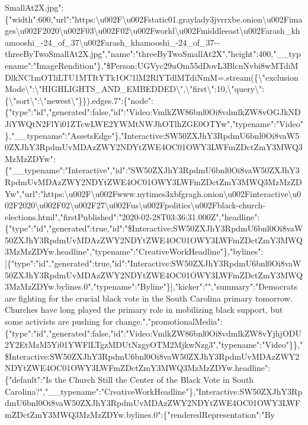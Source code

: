 SmallAt2X.jpg":\{"width":600,"url":"https:\textbackslash{}u002F\textbackslash{}u002Fstatic01.graylady3jvrrxbe.onion\textbackslash{}u002Fimages\textbackslash{}u002F2020\textbackslash{}u002F03\textbackslash{}u002F02\textbackslash{}u002Fworld\textbackslash{}u002Fmiddleeast\textbackslash{}u002Farash\_khamooshi\_-24\_of\_37\textbackslash{}u002Farash\_khamooshi\_-24\_of\_37-\/-threeByTwoSmallAt2X.jpg","name":"threeByTwoSmallAt2X","height":400,"\_\_typename":"ImageRendition"\},"\$Person:UGVyc29uOm55dDovL3BlcnNvbi8wMTdiMDlkNC1mOTliLTU1MTItYTk1OC1lM2RlYTdlMTdiNmM=.stream(\{\textbackslash{}"exclusionMode\textbackslash{}":\textbackslash{}"HIGHLIGHTS\_AND\_EMBEDDED\textbackslash{}",\textbackslash{}"first\textbackslash{}":10,\textbackslash{}"query\textbackslash{}":\{\textbackslash{}"sort\textbackslash{}":\textbackslash{}"newest\textbackslash{}"\}\}).edges.7":\{"node":\{"type":"id","generated":false,"id":"Video:VmlkZW86bnl0Oi8vdmlkZW8vOGJkNDJiYWQtN2FlYi01ZTcwLWE2YWMtNWJhOTlhZGE0OTYw","typename":"Video"\},"\_\_typename":"AssetsEdge"\},"Interactive:SW50ZXJhY3RpdmU6bnl0Oi8vaW50ZXJhY3RpdmUvMDAzZWY2NDYtZWE4OC01OWY3LWFmZDctZmY3MWQ3MzMzZDYw":\{"\_\_typename":"Interactive","id":"SW50ZXJhY3RpdmU6bnl0Oi8vaW50ZXJhY3RpdmUvMDAzZWY2NDYtZWE4OC01OWY3LWFmZDctZmY3MWQ3MzMzZDYw","url":"https:\textbackslash{}u002F\textbackslash{}u002Fwww.nytimes3xbfgragh.onion\textbackslash{}u002Finteractive\textbackslash{}u002F2020\textbackslash{}u002F02\textbackslash{}u002F27\textbackslash{}u002Fus\textbackslash{}u002Fpolitics\textbackslash{}u002Fblack-church-elections.html","firstPublished":"2020-02-28T03:36:31.000Z","headline":\{"type":"id","generated":true,"id":"\$Interactive:SW50ZXJhY3RpdmU6bnl0Oi8vaW50ZXJhY3RpdmUvMDAzZWY2NDYtZWE4OC01OWY3LWFmZDctZmY3MWQ3MzMzZDYw.headline","typename":"CreativeWorkHeadline"\},"bylines":{[}\{"type":"id","generated":true,"id":"Interactive:SW50ZXJhY3RpdmU6bnl0Oi8vaW50ZXJhY3RpdmUvMDAzZWY2NDYtZWE4OC01OWY3LWFmZDctZmY3MWQ3MzMzZDYw.bylines.0","typename":"Byline"\}{]},"kicker":"","summary":"Democrats
are fighting for the crucial black vote in the South Carolina primary
tomorrow. Churches have long played the primary role in mobilizing black
support, but some activists are pushing for
change.","promotionalMedia":\{"type":"id","generated":false,"id":"Video:VmlkZW86bnl0Oi8vdmlkZW8vYjhjODU2Y2EtMzM5Yi01YWFlLTgzMDUtNzgyOTM2MjkwNzg3","typename":"Video"\}\},"\$Interactive:SW50ZXJhY3RpdmU6bnl0Oi8vaW50ZXJhY3RpdmUvMDAzZWY2NDYtZWE4OC01OWY3LWFmZDctZmY3MWQ3MzMzZDYw.headline":\{"default":"Is
the Church Still the Center of the Black Vote in South
Carolina?","\_\_typename":"CreativeWorkHeadline"\},"Interactive:SW50ZXJhY3RpdmU6bnl0Oi8vaW50ZXJhY3RpdmUvMDAzZWY2NDYtZWE4OC01OWY3LWFmZDctZmY3MWQ3MzMzZDYw.bylines.0":\{"renderedRepresentation":"By
